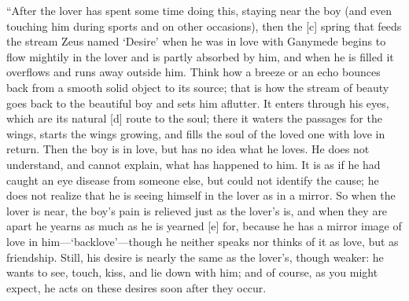 “After the lover has spent some time doing this, staying near the boy
(and even touching him during sports and on other occasions), then the
{[}c{]} spring that feeds the stream Zeus named ‘Desire' when he was in
love with Ganymede begins to flow mightily in the lover and is partly
absorbed by him, and when he is filled it overflows and runs away
outside him. Think how a breeze or an echo bounces back from a smooth
solid object to its source; that is how the stream of beauty goes back
to the beautiful boy and sets him aflutter. It enters through his eyes,
which are its natural {[}d{]} route to the soul; there it waters the
passages for the wings, starts the wings growing, and fills the soul of
the loved one with love in return. Then the boy is in love, but has no
idea what he loves. He does not understand, and cannot explain, what has
happened to him. It is as if he had caught an eye disease from someone
else, but could not identify the cause; he does not realize that he is
seeing himself in the lover as in a mirror. So when the lover is near,
the boy's pain is relieved just as the lover's is, and when they are
apart he yearns as much as he is yearned {[}e{]} for, because he has a
mirror image of love in him---‘backlove'---though he neither speaks nor
thinks of it as love, but as friendship. Still, his desire is nearly the
same as the lover's, though weaker: he wants to see, touch, kiss, and
lie down with him; and of course, as you might expect, he acts on these
desires soon after they occur.

